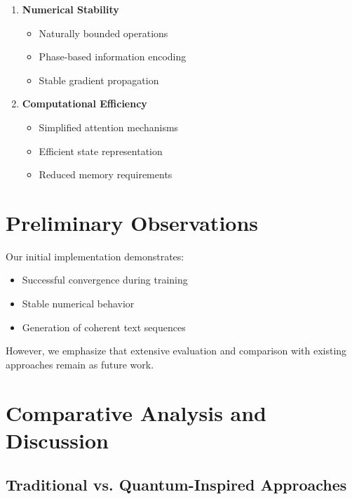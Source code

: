 \documentclass[twocolumn]{article}
\begin{document}
\begin{enumerate}
    \item \textbf{Numerical Stability}
    \begin{itemize}
        \item Naturally bounded operations
        \item Phase-based information encoding
        \item Stable gradient propagation
    \end{itemize}

    \item \textbf{Computational Efficiency}
    \begin{itemize}
        \item Simplified attention mechanisms
        \item Efficient state representation
        \item Reduced memory requirements
    \end{itemize}
\end{enumerate}

\section{Preliminary Observations}
Our initial implementation demonstrates:
\begin{itemize}
    \item Successful convergence during training
    \item Stable numerical behavior
    \item Generation of coherent text sequences
\end{itemize}

However, we emphasize that extensive evaluation and comparison with existing approaches remain as future work.

\section{Comparative Analysis and Discussion}

\subsection{Traditional vs. Quantum-Inspired Approaches}
\end{document}
